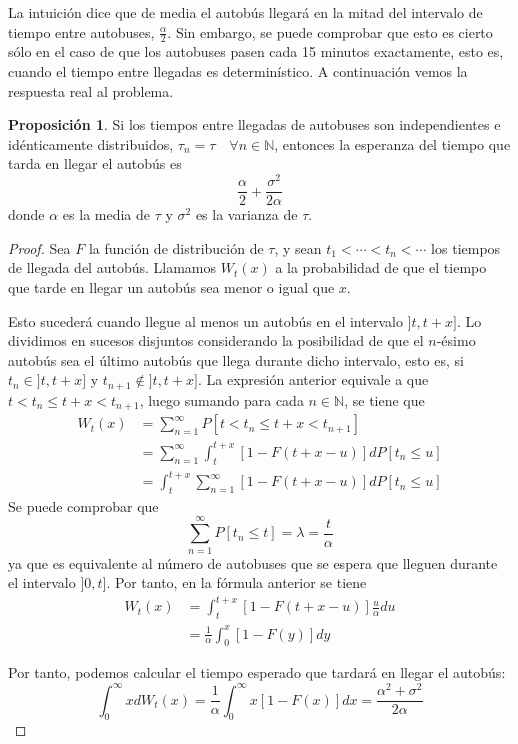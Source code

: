 \documentclass[a4paper,10pt]{scrartcl}
\theoremstyle{definition}
\newtheorem*{fact*}{Proposición}
\numberwithin{equation}{section}
\begin{document}
	La intuición dice que de media el autobús llegará en la mitad del intervalo de tiempo entre autobuses, $\frac{\alpha}{2}$. Sin embargo, se puede comprobar que esto es cierto sólo en el caso de que los autobuses pasen cada 15 minutos exactamente, esto es, cuando el tiempo entre llegadas es determinístico. A continuación vemos la respuesta real al problema.
	
	\begin{fact*}
		Si los tiempos entre llegadas de autobuses son independientes e idénticamente distribuidos, $\tau_n = \tau \quad \forall n \in \mathbb{N}$, entonces la esperanza del tiempo que tarda en llegar el autobús es
		$$\frac{\alpha}{2} + \frac{\sigma^2}{2\alpha} $$
		donde $\alpha$ es la media de $\tau$ y $\sigma^2$ es la varianza de $\tau$.
	\end{fact*}
	
	\begin{proof}
		Sea $F$ la función de distribución de $\tau$, y sean $t_1 < \cdots < t_n < \cdots$ los tiempos de llegada del autobús. Llamamos $W_t(x)$ a la probabilidad de que el tiempo que tarde en llegar un autobús sea menor o igual que $x$.
		
		Esto sucederá cuando llegue al menos un autobús en el intervalo $\rbrack t, t+x\rbrack$. Lo dividimos en sucesos disjuntos considerando la posibilidad de que el $n$-ésimo autobús sea el último autobús que llega durante dicho intervalo, esto es, si $t_n \in \rbrack t, t+x \rbrack$ y $t_{n+1} \notin \rbrack t, t+x \rbrack$. La expresión anterior equivale a que $t < t_n \leq t+x < t_{n+1}$, luego sumando para cada $n \in \mathbb{N}$, se tiene que
		\begin{align*}
		W_t(x) &= \sum_{n=1}^\infty P[t < t_n \leq t+x < t_{n+1}] \\
		&= \sum_{n=1}^\infty \int_t^{t+x} [1-F(t+x-u)]dP[t_n \leq u] \\
		&= \int_t^{t+x} \sum_{n=1}^\infty [1-F(t+x-u)]dP[t_n \leq u]
		\end{align*}
		Se puede comprobar que
		$$ \sum_{n=1}^\infty P[t_n \leq t] = \lambda = \frac{t}{\alpha} $$
		ya que es equivalente al número de autobuses que se espera que lleguen durante el intervalo $\rbrack 0,t \rbrack$.
		Por tanto, en la fórmula anterior se tiene
		\begin{align*}
		W_t(x) &= \int_t^{t+x} [1-F(t+x-u)]\frac{u}{\alpha}du \\
		&= \frac{1}{\alpha}\int_0^x [1-F(y)]dy
		\end{align*}
		
		Por tanto, podemos calcular el tiempo esperado que tardará en llegar el autobús:
		$$ \int_0^\infty xdW_t(x) = \frac{1}{\alpha}\int_0^\infty x[1-F(x)]dx = \frac{\alpha^2+\sigma^2}{2\alpha}$$
	\end{proof}
	
\end{document}
